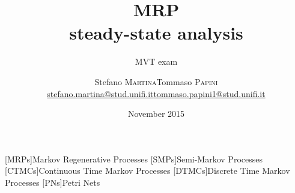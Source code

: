 





\title[\acs{MRP} steady-state]{\textbf{\acl{MRP}\\
    steady-state analysis}}
\date[27 November 2015]{ November 2015}
\subtitle{MVT exam}

\author[Martina - Papini]{
  \begin{center}
    \begin{tabular}{lr}
      Stefano \textsc{Martina}&Tommaso \textsc{Papini}\\
      \href{mailto:stefano.martina@stud.unifi.it}{stefano.martina@stud.unifi.it}&
      \href{mailto:tommaso.papini1@stud.unifi.it}{tommaso.papini1@stud.unifi.it}
    \end{tabular}
  \end{center}
}



[MRPs]{Markov Regenerative Processes}
[SMPs]{Semi-Markov Processes}
[CTMCs]{Continuous Time Markov Processes}
[DTMCs]{Discrete Time Markov Processes}
[PNs]{Petri Nets}

